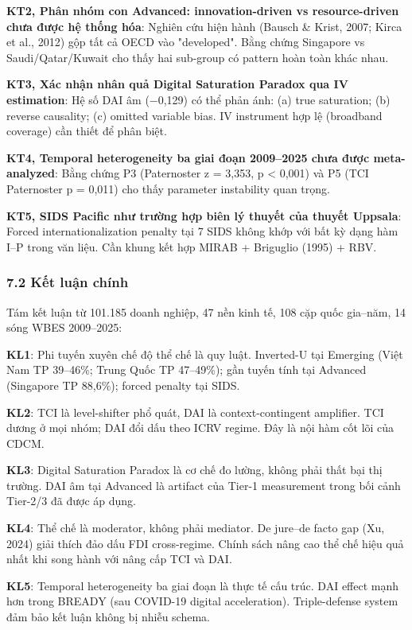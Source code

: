 \documentclass[12pt,a4paper]{article}
\begin{document}
\textbf{KT2, Phân nhóm con Advanced: innovation-driven vs
resource-driven chưa được hệ thống hóa}: Nghiên cứu hiện hành (Bausch \&
Krist, 2007; Kirca et al., 2012) gộp tất cả OECD vào "developed". Bằng
chứng Singapore vs Saudi/Qatar/Kuwait cho thấy hai sub-group có pattern
hoàn toàn khác nhau.

\textbf{KT3, Xác nhận nhân quả Digital Saturation Paradox qua IV
estimation}: Hệ số DAI âm (−0,129) có thể phản ánh: (a) true saturation;
(b) reverse causality; (c) omitted variable bias. IV instrument hợp lệ
(broadband coverage) cần thiết để phân biệt.

\textbf{KT4, Temporal heterogeneity ba giai đoạn 2009--2025 chưa được
meta-analyzed}: Bằng chứng P3 (Paternoster z = 3,353, p \textless{}
0,001) và P5 (TCI Paternoster p = 0,011) cho thấy parameter instability
quan trọng.

\textbf{KT5, SIDS Pacific như trường hợp biên lý thuyết của thuyết
Uppsala}: Forced internationalization penalty tại 7 SIDS không khớp với
bất kỳ dạng hàm I--P trong văn liệu. Cần khung kết hợp MIRAB + Briguglio
(1995) + RBV.

\hypertarget{72-kux1ebft-luux1eadn-chuxednh}{%
\subsubsection{7.2 Kết luận
chính}\label{72-kux1ebft-luux1eadn-chuxednh}}

Tám kết luận từ 101.185 doanh nghiệp, 47 nền kinh tế, 108 cặp quốc
gia--năm, 14 sóng WBES 2009--2025:

\textbf{KL1}: Phi tuyến xuyên chế độ thể chế là quy luật. Inverted-U tại
Emerging (Việt Nam TP 39--46\%; Trung Quốc TP 47--49\%); gần tuyến tính
tại Advanced (Singapore TP 88,6\%); forced penalty tại SIDS.

\textbf{KL2}: TCI là level-shifter phổ quát, DAI là context-contingent
amplifier. TCI dương ở mọi nhóm; DAI đổi dấu theo ICRV regime. Đây là
nội hàm cốt lõi của CDCM.

\textbf{KL3}: Digital Saturation Paradox là cơ chế đo lường, không phải
thất bại thị trường. DAI âm tại Advanced là artifact của Tier-1
measurement trong bối cảnh Tier-2/3 đã được áp dụng.

\textbf{KL4}: Thể chế là moderator, không phải mediator. De jure--de
facto gap (Xu, 2024) giải thích đảo dấu FDI cross-regime. Chính sách
nâng cao thể chế hiệu quả nhất khi song hành với nâng cấp TCI và DAI.

\textbf{KL5}: Temporal heterogeneity ba giai đoạn là thực tế cấu trúc.
DAI effect mạnh hơn trong BREADY (sau COVID-19 digital acceleration).
Triple-defense system đảm bảo kết luận không bị nhiễu schema.
\end{document}
